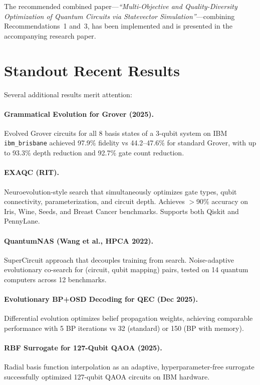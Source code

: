 \documentclass[11pt]{article}
\begin{document}
The recommended combined paper---\emph{``Multi-Objective and Quality-Diversity Optimization of Quantum Circuits via Statevector Simulation''}---combining Recommendations~1 and~3, has been implemented and is presented in the accompanying research paper.

\section{Standout Recent Results}
\label{sec:standout}

Several additional results merit attention:

\paragraph{Grammatical Evolution for Grover (2025).}
Evolved Grover circuits for all 8 basis states of a 3-qubit system on IBM \texttt{ibm\_brisbane} achieved 97.9\% fidelity vs 44.2--47.6\% for standard Grover, with up to 93.3\% depth reduction and 92.7\% gate count reduction.

\paragraph{EXAQC (RIT).}
Neuroevolution-style search that simultaneously optimizes gate types, qubit connectivity, parameterization, and circuit depth. Achieves $>$90\% accuracy on Iris, Wine, Seeds, and Breast Cancer benchmarks. Supports both Qiskit and PennyLane.

\paragraph{QuantumNAS (Wang et al., HPCA 2022).}
SuperCircuit approach that decouples training from search. Noise-adaptive evolutionary co-search for (circuit, qubit mapping) pairs, tested on 14 quantum computers across 12 benchmarks.

\paragraph{Evolutionary BP+OSD Decoding for QEC (Dec 2025).}
Differential evolution optimizes belief propagation weights, achieving comparable performance with 5 BP iterations vs 32 (standard) or 150 (BP with memory).

\paragraph{RBF Surrogate for 127-Qubit QAOA (2025).}
Radial basis function interpolation as an adaptive, hyperparameter-free surrogate successfully optimized 127-qubit QAOA circuits on IBM hardware.
\end{document}
